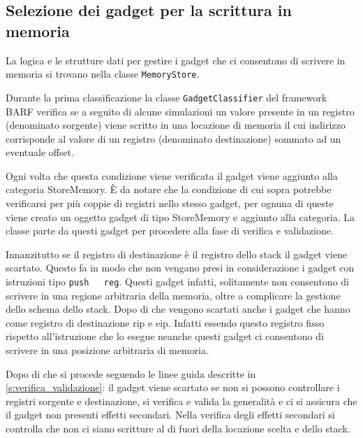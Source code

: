 \subsection{Selezione dei gadget per la scrittura in memoria}
\label{sec:memorystore}

La logica e le strutture dati per gestire i gadget che ci consentono
di scrivere in memoria si trovano nella classe
\lstinline{MemoryStore}. 

Durante la prima classificazione la classe
\lstinline{GadgetClassifier} del framework BARF verifica se a seguito
di alcune simulazioni un valore presente in un registro (denominato
sorgente) viene scritto in una locazione di memoria il cui indirizzo
corrisponde al valore di un registro (denominato destinazione) sommato
ad un eventuale offset.

Ogni volta che questa condizione viene verificata il gadget viene
aggiunto alla categoria StoreMemory. È da notare che la condizione di
cui sopra potrebbe verificarsi per più coppie di registri nello stesso
gadget, per ognuna di queste viene creato un oggetto gadget di tipo
StoreMemory e aggiunto alla categoria. La classe parte da questi
gadget per procedere alla fase di verifica e validazione.

Innanzitutto se il registro di destinazione è il registro dello stack
il gadget viene scartato. Questo fa in modo che non vengano presi in
considerazione i gadget con istruzioni tipo \lstinline{push
  reg}. Questi gadget infatti, solitamente non consentono di scrivere
in una regione arbitraria della memoria, oltre a complicare la
gestione dello schema dello stack. Dopo di che vengono scartati anche
i gadget che hanno come registro di destinazione rip e eip. Infatti
essendo questo registro fisso rispetto all'istruzione che lo esegue
neanche questi gadget ci consentono di scrivere in una posizione
arbitraria di memoria.

Dopo di che si procede seguendo le linee guida descritte in
\ref{s:verifica_validazione}: il gadget viene scartato se non si
possono controllare i registri sorgente e destinazione, si verifica e
valida la generalità e ci si assicura che il gadget non presenti
effetti secondari. Nella verifica degli effetti secondari si controlla
che non ci siano scritture al di fuori della locazione scelta e dello
stack.

